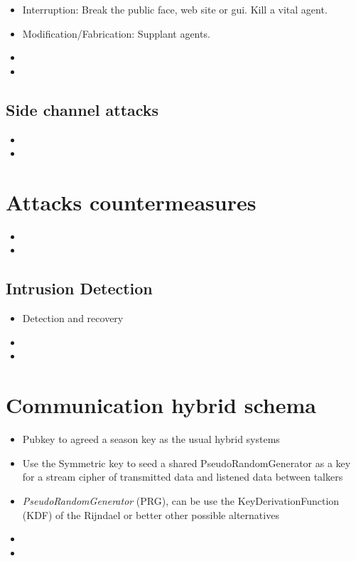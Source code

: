 \documentclass[10pt,a4paper,twoside]{llncs}
\begin{document}
\begin{itemize}
 \item Interruption: Break the public face, web site or gui. Kill a vital agent.
 \item Modification/Fabrication: Supplant agents.
 \item 
 \item 
\end{itemize}

%
\subsection{Side channel attacks}

\begin{itemize}
 \item
 \item 
\end{itemize}

%
\section{Attacks countermeasures}

\begin{itemize}
 \item
 \item 
\end{itemize}

%
\subsection{Intrusion Detection}

\begin{itemize}
 \item Detection and recovery
 \item 
 \item 
\end{itemize}

%
\section{Communication hybrid schema \label{sec:intercom}}

\begin{itemize}
 \item Pubkey to agreed a season key as the usual hybrid systems
 \item Use the Symmetric key to seed a shared PseudoRandomGenerator as a key for a stream cipher of transmitted data and listened data between talkers
 \item \emph{PseudoRandomGenerator} (PRG), can be use the KeyDerivationFunction (KDF) of the Rijndael or better other possible alternatives
 \item 
 \item 
\end{itemize}
\end{document}
